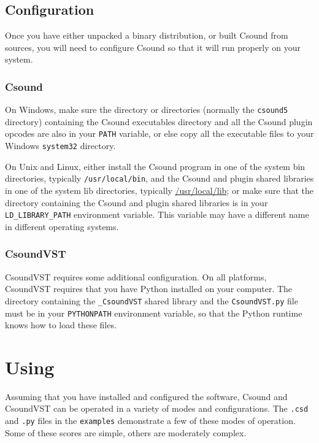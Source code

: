 \documentclass[10pt,letterpaper,onecolumn]{book}
\begin{document}


\section{Configuration}

Once you have either unpacked a binary distribution, or built Csound from sources, you will need to configure Csound so that it will run properly on your system. 

\subsection{Csound}

On Windows, make sure the directory or directories (normally the \texttt{csound5} directory) containing the Csound executables directory and all the Csound plugin opcodes are also in your \texttt{PATH} variable, or else copy all the executable files to your Windows \texttt{system32} directory.

On Unix and Linux, either install the Csound program in one of the system bin directories, typically \texttt{/usr/local/bin}, and the Csound and plugin shared libraries in one of the system lib directories, typically \url{/usr/local/lib}; or make sure that the directory containing the Csound and plugin shared libraries is in your \texttt{LD\_LIBRARY\_PATH} environment variable. This variable may have a different name in different operating systems.

\subsection{CsoundVST}

CsoundVST requires some additional configuration. On all platforms, CsoundVST requires that you have Python installed on your computer. The directory containing the \texttt{\_CsoundVST} shared library and the \texttt{CsoundVST.py} file must be in your \texttt{PYTHONPATH} environment variable, so that the Python runtime knows how to load these files.

\chapter{Using}

Assuming that you have installed and configured the software, Csound and CsoundVST can be operated in a variety of modes and configurations. The \texttt{.csd} and \texttt{.py} files in the \texttt{examples} demonstrate a few of these modes of operation. Some of these scores are simple, others are moderately complex. 
\end{document}

